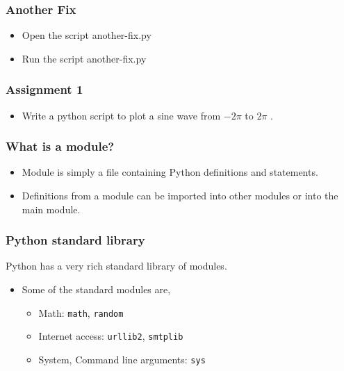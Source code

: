 \documentclass[17pt]{beamer}
\begin{document}
\begin{frame}[fragile]
\frametitle{Another Fix}
\label{sec-11}

\begin{itemize}
	\item Open the script another-fix.py\pause
	\item Run the script another-fix.py
\end{itemize}
\end{frame}
\begin{frame}
\frametitle{Assignment 1}
\label{sec-12}

\begin{itemize}
\item Write a python script to plot a sine wave from 
    $-2\pi$
  to 
    $2\pi$
  .
\end{itemize}
\end{frame}
\begin{frame}
\frametitle{What is a module?}
\label{sec-13}
\begin{itemize}
\item Module is simply a file containing Python definitions and
  statements.\pause
\item Definitions from a module can be imported into other
  modules or into the main module.
\end{itemize}
  
\end{frame}
\begin{frame}
\frametitle{Python standard library}
\label{sec-14.1}

  Python has a very rich standard library of modules.\pause

\begin{itemize}
\item Some of the standard modules are,
	\begin{itemize}
	\item Math: \texttt{math}, \texttt{random}\pause
	\item Internet access: \texttt{urllib2}, \texttt{smtplib}\pause
	\item System, Command line arguments: \texttt{sys}
	\end{itemize}
\end{itemize}
\end{frame}
\end{document}
